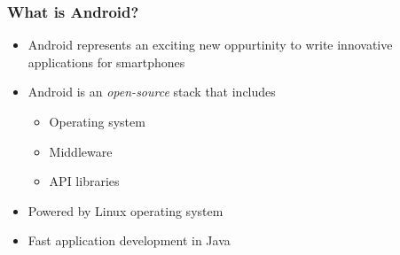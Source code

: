 %
%

\begin{frame}
  \frametitle{What is Android?}
  
  \begin{itemize}
    
  \item<1-> Android represents an exciting new oppurtinity to write
    innovative applications for smartphones
  \item<2-> Android is an \emph{open-source} stack that includes
    \begin{itemize}
    \item<3-> Operating system
    \item<3-> Middleware
    \item<3-> API libraries
    \end{itemize}
    
  \item<3-> Powered by Linux operating system

  \item<4-> Fast application development in Java

  \end{itemize}

\end{frame}



